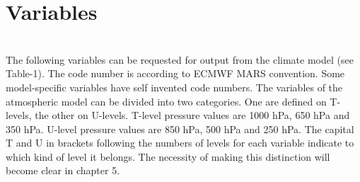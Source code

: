 \section{Variables} 
\\
The following variables can be requested for output from the climate model (see Table-1).  The code number is according 
to ECMWF MARS convention. Some model-specific variables have self invented code numbers. The variables of the
atmospheric model can be divided into two categories.  One are defined on T-levels, the other on U-levels.
T-level pressure values are 1000 hPa, 650 hPa and 350 hPa. U-level pressure values are 850 hPa, 500 hPa 
and 250 hPa. 
\newpage
The capital T and U in brackets following the numbers of levels for each variable indicate to 
which kind of level it belongs. The necessity of making this distinction will become clear in chapter 5. \\
\\ 
